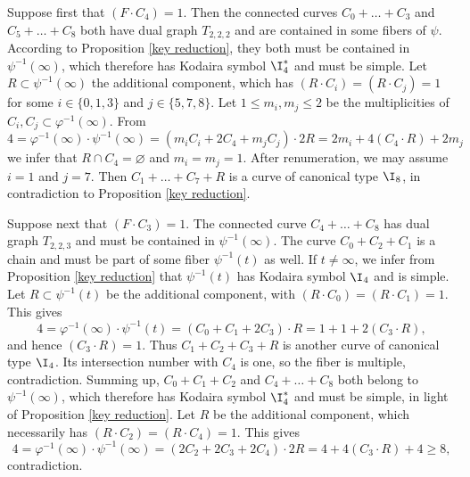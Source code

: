 Suppose first that $(F\cdot C_4)=1$. Then the connected curves $C_0+\ldots+C_3$ and $C_5+\ldots+C_8$ both have
dual graph $T_{2,2,2}$ and are contained in some fibers of $\psi$. According to Proposition \ref{key reduction},
they both must be contained in
$\psi^{-1}(\infty)$, which therefore has  Kodaira symbol $\I_4^*$ and must be simple.
Let $R\subset \psi^{-1}(\infty)$ the additional component, which has $(R\cdot C_i)=(R\cdot C_j)=1$ for some
$i\in\{0,1,3\}$ and $j\in\{5,7,8\}$. Let $1\leq m_i,m_j\leq 2$ be the multiplicities of $C_i,C_j\subset\varphi^{-1}(\infty)$.
From
$$
4=\varphi^{-1}(\infty)\cdot\psi^{-1}(\infty) = (m_iC_i+2C_4+m_jC_j)\cdot 2R = 2m_i+4(C_4\cdot R) + 2m_j
$$
we infer that $R\cap C_4=\varnothing$ and $m_i=m_j=1$. After renumeration,
we may assume $i=1$ and $j=7$. Then $C_1+\ldots+C_7+R$ is a curve
of canonical type $\I_8$, in contradiction to Proposition \ref{key reduction}.

Suppose next that $(F\cdot C_3)=1$.
The connected curve $C_4+\ldots+C_8$ has dual graph $T_{2,2,3}$ and must be contained in   $\psi^{-1}(\infty)$.
The curve $C_0+C_2+C_1$ is a chain and must be part of some fiber $\psi^{-1}(t)$ as well.
If $t\neq\infty$,
we infer from Proposition \ref{key reduction} that $\psi^{-1}(t)$ has Kodaira symbol $\I_4$
and is simple.  Let $R\subset \psi^{-1}(t)$ be the additional component, with $(R\cdot C_0)=(R\cdot C_1)=1$.
This gives
$$
4=\varphi^{-1}(\infty)\cdot \psi^{-1}(t) = (C_0+C_1+2C_3) \cdot R = 1+1+ 2(C_3\cdot R),
$$
and hence  $(C_3\cdot R)=1$. Thus $C_1+C_2+C_3+R$ is another curve of canonical type $\I_4$. Its intersection number with $C_4$ is one,
so the fiber is multiple, contradiction.
Summing up,  $C_0+C_1+C_2$ and $C_4+\ldots+C_8$ both belong to   $\psi^{-1}(\infty)$, which therefore
has Kodaira symbol $\I_4^*$ and must be simple, in light of Proposition \ref{key reduction}. Let $R$ be the additional component, which necessarily has
$(R\cdot C_2)=(R\cdot C_4)=1$. This gives
$$
4=\varphi^{-1}(\infty)\cdot \psi^{-1}(\infty) = (2C_2+2C_3+2C_4)\cdot 2R = 4+4(C_3\cdot R) + 4\geq 8,
$$
contradiction.

